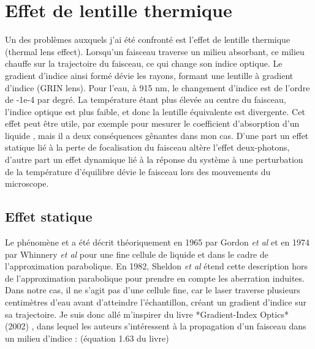 \section{Effet de lentille thermique}

Un des problèmes auxquels j'ai été confronté est l'effet de lentille thermique (thermal lens effect). Lorsqu'un faisceau traverse un milieu absorbant, ce milieu chauffe sur la trajectoire du faisceau, ce qui change son indice optique. Le gradient d'indice ainsi formé dévie les rayons, formant une lentille à gradient d'indice (GRIN lens). Pour l'eau, à 915 nm, le changement d'indice est de l'ordre de -1e-4 par degré. La température étant plus élevée au centre du faisceau, l'indice optique est plus faible, et donc la lentille équivalente est divergente. Cet effet peut être utile, par exemple pour mesurer le coefficient d'absorption d'un liquide \cite{whinnery_laser_1974}, mais il a deux conséquences gênantes dans mon cas. D'une part un effet statique lié à la perte de focalisation du faisceau altère l'effet deux-photons, d'autre part un effet dynamique lié à la réponse du système à une perturbation de la température d'équilibre dévie le faisceau lors des mouvements du microscope.



\subsection{Effet statique}


Le phénomène et a été décrit théoriquement en 1965 par Gordon \emph{et al} \cite{gordon_longtransient_1965} et en 1974 par Whinnery \emph{et al} \cite{whinnery_laser_1974} pour une fine cellule de liquide et dans le cadre de l'approximation parabolique. En 1982, Sheldon \emph{et al} \cite{sheldon_laser-induced_1982} étend cette description hors de l'approximation parabolique pour prendre en compte les aberration induites. Dans notre cas, il ne s'agit pas d'une cellule fine, car le laser traverse plusieurs centimètres d'eau avant d'atteindre l'échantillon, créant un gradient d'indice sur sa trajectoire. Je suis donc allé m'inspirer du livre *Gradient-Index Optics* (2002) \cite{gomez-reino_gradient-index_2002}, dans lequel les auteurs s'intéressent à la propagation d'un faisceau dans un milieu d'indice : (équation 1.63 du livre)

